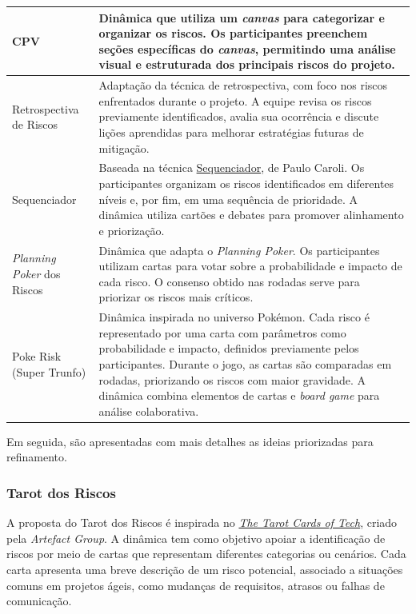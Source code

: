 \documentclass[
	12pt,
	openright,
	twoside,
	a4paper,
	english,
	brazil
	]{abntex2}
\begin{document}
\begin{longtable}{|p{3cm}|p{12cm}|}
  CPV & Dinâmica que utiliza um \textit{canvas} para categorizar e organizar os riscos. Os participantes preenchem seções específicas do \textit{canvas}, permitindo uma análise visual e estruturada dos principais riscos do projeto. \\ \hline
  Retrospectiva de Riscos & Adaptação da técnica de retrospectiva, com foco nos riscos enfrentados durante o projeto. A equipe revisa os riscos previamente identificados, avalia sua ocorrência e discute lições aprendidas para melhorar estratégias futuras de mitigação. \\ \hline
  Sequenciador & Baseada na técnica \href{https://caroli.org/sequenciador/}{Sequenciador}, de Paulo Caroli. Os participantes organizam os riscos identificados em diferentes níveis e, por fim, em uma sequência de prioridade. A dinâmica utiliza cartões e debates para promover alinhamento e priorização. \\ \hline
  \textit{Planning Poker} dos Riscos & Dinâmica que adapta o \textit{Planning Poker}. Os participantes utilizam cartas para votar sobre a probabilidade e impacto de cada risco. O consenso obtido nas rodadas serve para priorizar os riscos mais críticos. \\ \hline
  Poke Risk (Super Trunfo) & Dinâmica inspirada no universo Pokémon. Cada risco é representado por uma carta com parâmetros como probabilidade e impacto, definidos previamente pelos participantes. Durante o jogo, as cartas são comparadas em rodadas, priorizando os riscos com maior gravidade. A dinâmica combina elementos de cartas e \textit{board game} para análise colaborativa. \\ \hline
\end{longtable}

Em seguida, são apresentadas com mais detalhes as ideias priorizadas para refinamento.

\subsubsection{Tarot dos Riscos}

A proposta do Tarot dos Riscos é inspirada no \href{https://tarotcardsoftech.artefactgroup.com/}{\textit{The Tarot Cards of Tech}}, criado pela \textit{Artefact Group}. A dinâmica tem como objetivo apoiar a identificação de riscos por meio de cartas que representam diferentes categorias ou cenários. Cada carta apresenta uma breve descrição de um risco potencial, associado a situações comuns em projetos ágeis, como mudanças de requisitos, atrasos ou falhas de comunicação.
\end{document}
